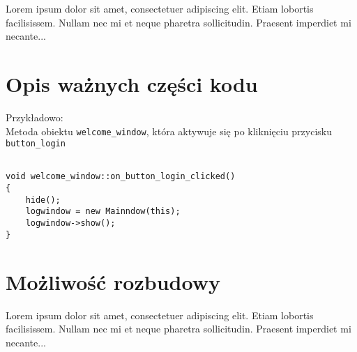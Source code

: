 \documentclass{article}
\begin{document}
 
Lorem ipsum dolor sit amet, consectetuer adipiscing elit.  
Etiam lobortis facilisissem.  Nullam nec mi et neque pharetra 
sollicitudin.  Praesent imperdiet mi necante...

\section{Opis ważnych części kodu}
 
Przykładowo: \\

Metoda obiektu \verb|welcome_window|, która aktywuje się po kliknięciu przycisku \verb|button_login|
\\

\begin{tcolorbox}
\begin{lstlisting}

void welcome_window::on_button_login_clicked()
{
    hide();
    logwindow = new Mainndow(this);
    logwindow->show();
}

\end{lstlisting}
\end{tcolorbox}

\section{Możliwość rozbudowy}
 
Lorem ipsum dolor sit amet, consectetuer adipiscing elit.  
Etiam lobortis facilisissem.  Nullam nec mi et neque pharetra 
sollicitudin.  Praesent imperdiet mi necante...
 
\end{document}
